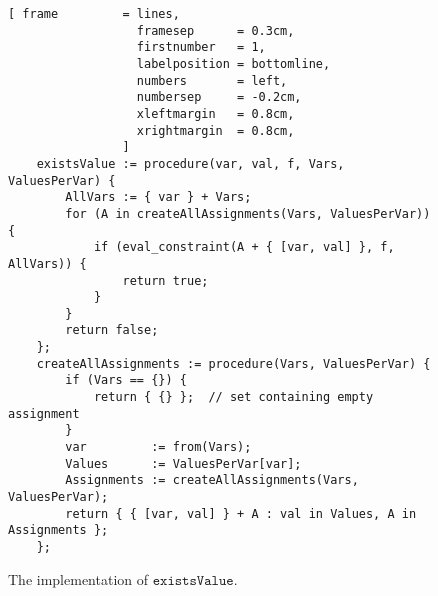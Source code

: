 \begin{figure}[!ht]
\centering
\begin{Verbatim}[ frame         = lines, 
                  framesep      = 0.3cm, 
                  firstnumber   = 1,
                  labelposition = bottomline,
                  numbers       = left,
                  numbersep     = -0.2cm,
                  xleftmargin   = 0.8cm,
                  xrightmargin  = 0.8cm,
                ]
    existsValue := procedure(var, val, f, Vars, ValuesPerVar) {
        AllVars := { var } + Vars;
        for (A in createAllAssignments(Vars, ValuesPerVar)) {
            if (eval_constraint(A + { [var, val] }, f, AllVars)) {
                return true;
            }
        }
        return false;    
    };
    createAllAssignments := procedure(Vars, ValuesPerVar) {
        if (Vars == {}) {
            return { {} };  // set containing empty assignment
        }
        var         := from(Vars);
        Values      := ValuesPerVar[var];
        Assignments := createAllAssignments(Vars, ValuesPerVar);
        return { { [var, val] } + A : val in Values, A in Assignments };
    };
\end{Verbatim}
\vspace*{-0.3cm}
\caption{The implementation of $\mathtt{existsValue}$.}
\label{fig:csp-consistency.stlx:existsValue}
\end{figure}

